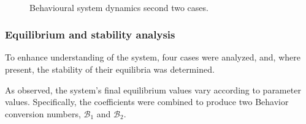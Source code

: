 \begin{figure}[h]
	\centering
	 \quad
	 \\
		\caption[Behavioural model simulation second]{Behavioural system dynamics second two cases.}
	\label{fig:model__behavior_sim_2}
\end{figure}

\subsubsection{Equilibrium and stability analysis}
To enhance understanding of the system, four cases were analyzed, and, where present, the stability of their equilibria was determined.

As observed, the system’s final equilibrium values vary according to parameter values. Specifically, the coefficients were combined to produce two Behavior conversion numbers, $\mathcal{B}_1$ and $\mathcal{B}_2$.

